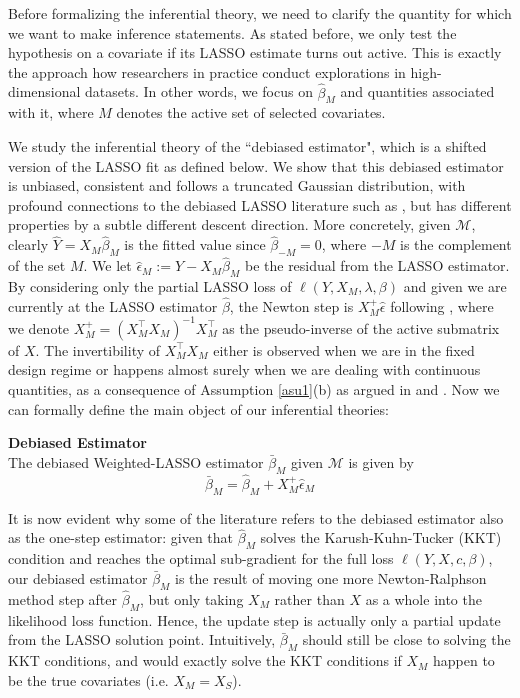\documentclass[11pt]{article}
\newcommand{\NL}{\\[.25cm]}
\begin{document}

Before formalizing the inferential theory, we need to clarify the quantity for which we want to make inference statements. As stated before, we only test the hypothesis on a covariate if its LASSO estimate turns out active. This is exactly the approach how researchers in practice conduct explorations in high-dimensional datasets. In other words, we focus on $\hat{\beta}_M$ and quantities associated with it, where $M$ denotes the active set of selected covariates. 

We study the inferential theory of the ``debiased estimator", which is a shifted version of the LASSO fit as defined below. We show that this debiased estimator is unbiased, consistent and follows a truncated Gaussian distribution, with profound connections to the debiased LASSO literature such as \cite{10.1214/17-AOS1630}, but has different properties by a subtle different descent direction. More concretely, given $\mathcal{M}$, clearly $\hat{Y}=X_M\hat{\beta}_M$ is the fitted value since $\hat{\beta}_{-M}=0$, where $-M$ is the complement of the set $M$. We let $\hat{\epsilon}_M:=Y-X_M\hat{\beta}_M$ be the residual from the LASSO estimator. By considering only the partial LASSO loss of $\ell(Y,X_M,\lambda,\beta)$ and given we are currently at the LASSO estimator $\hat{\beta}$, the Newton step is $X_M^+\hat{\epsilon}$ following \cite[\S~9.5.2]{boyd2004convex}, where we denote $X_M^+=(X_M^\top X_M)^{-1}X_M^\top $ as the pseudo-inverse of the active submatrix of $X$. The invertibility of $X_M^\top X_M$ either is observed when we are in the fixed design regime or happens almost surely when we are dealing with continuous quantities, as a consequence of Assumption \ref{asu1}(b) as argued in \cite{10.1214/13-EJS815} and \cite{lee2016exact}. Now we can formally define the main object of our inferential theories:


\begin{def_app}{\bf Debiased Estimator}\label{def2}\\
	The debiased Weighted-LASSO estimator $\bar{\beta}_M$ given $\mathcal{M}$ is given by
	\begin{equation}\label{11}
		\bar{\beta}_{M}=\hat{\beta}_{M}+X_M^+\hat{\epsilon}_M
	\end{equation}
\end{def_app}


It is now evident why some of the literature refers to the debiased estimator also as the one-step estimator: given that $\hat{\beta}_M$ solves the Karush-Kuhn-Tucker (KKT) condition and reaches the optimal sub-gradient for the full loss $\ell(Y,X,c,\beta)$, our debiased estimator $\bar{\beta}_M$ is the result of moving {one} more Newton-Ralphson method {step} after $\hat{\beta}_M$, but only taking $X_M$ rather than $X$ as a whole into the likelihood loss function. Hence, the update step is actually only a partial update from the LASSO solution point. Intuitively, $\bar{\beta}_M$ should still be close to solving the KKT conditions, and would exactly solve the KKT conditions if $X_M$ happen to be the true covariates (i.e. $X_M=X_S$). 
\end{document}

